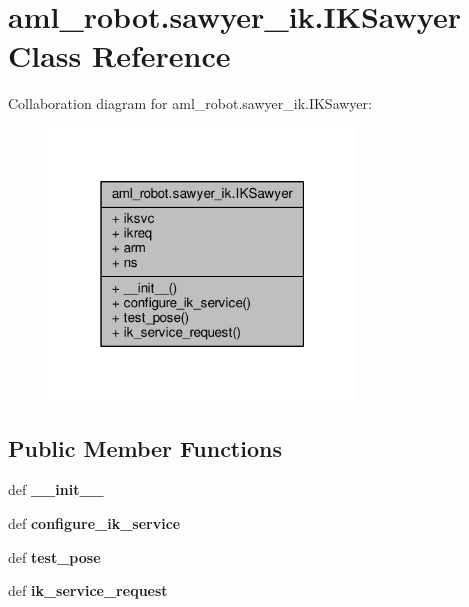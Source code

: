 \hypertarget{classaml__robot_1_1sawyer__ik_1_1_i_k_sawyer}{\section{aml\-\_\-robot.\-sawyer\-\_\-ik.\-I\-K\-Sawyer Class Reference}
\label{classaml__robot_1_1sawyer__ik_1_1_i_k_sawyer}
}


Collaboration diagram for aml\-\_\-robot.\-sawyer\-\_\-ik.\-I\-K\-Sawyer\-:
\nopagebreak
\begin{figure}[H]
\begin{center}
\leavevmode
\includegraphics[width=232pt]{classaml__robot_1_1sawyer__ik_1_1_i_k_sawyer__coll__graph}
\end{center}
\end{figure}
\subsection*{Public Member Functions}
\begin{DoxyCompactItemize}
\item 
\hypertarget{classaml__robot_1_1sawyer__ik_1_1_i_k_sawyer_a65178d63636b88d3d2e408e935c99942}{def {\bfseries \-\_\-\-\_\-init\-\_\-\-\_\-}}\label{classaml__robot_1_1sawyer__ik_1_1_i_k_sawyer_a65178d63636b88d3d2e408e935c99942}

\item 
\hypertarget{classaml__robot_1_1sawyer__ik_1_1_i_k_sawyer_a00d497c052f10e0aa35725d2f3b10011}{def {\bfseries configure\-\_\-ik\-\_\-service}}\label{classaml__robot_1_1sawyer__ik_1_1_i_k_sawyer_a00d497c052f10e0aa35725d2f3b10011}

\item 
\hypertarget{classaml__robot_1_1sawyer__ik_1_1_i_k_sawyer_a979a1ec545060a095c80780032d9e357}{def {\bfseries test\-\_\-pose}}\label{classaml__robot_1_1sawyer__ik_1_1_i_k_sawyer_a979a1ec545060a095c80780032d9e357}

\item 
\hypertarget{classaml__robot_1_1sawyer__ik_1_1_i_k_sawyer_a0f91c727068633104572e46478952dec}{def {\bfseries ik\-\_\-service\-\_\-request}}\label{classaml__robot_1_1sawyer__ik_1_1_i_k_sawyer_a0f91c727068633104572e46478952dec}

\end{DoxyCompactItemize}
